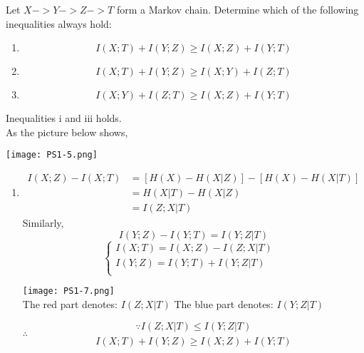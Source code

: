 \documentclass[12pt]{article}
\newenvironment{solution}[2][Solution]{\begin{trivlist}
\item[\hskip \labelsep {\bfseries #1}]}{\end{trivlist}}
\newenvironment{problem}[2][Problem]{\begin{trivlist}
\item[\hskip \labelsep {\bfseries #1}\hskip \labelsep {\bfseries #2.}]}{\end{trivlist}}
\begin{document}
\begin{problem}{8 Markov chain with 4 random variables}
    \item
    Let $X->Y->Z->T$ form a Markov chain. Determine which of the following inequalities always hold:
    \begin{enumerate}[label=\roman*]
        \item $$I(X;T)+I(Y;Z)\geq I(X;Z)+I(Y;T)$$
        \item $$I(X;T)+I(Y;Z)\geq I(X;Y)+I(Z;T)$$
        \item $$I(X;Y)+I(Z;T)\geq I(X;Z)+I(Y;T)$$
    \end{enumerate}
\end{problem}

\begin{solution}{}
    \item
    Inequalities i and iii holds.\\
    As the picture below shows,
    \begin{center}
        \texttt{[image: PS1-5.png]}
    \end{center}
    \begin{enumerate}[label=\roman*]
        \item
        \begin{align*}
            I(X;Z)-I(X;T)&=[H(X)-H(X|Z)]-[H(X)-H(X|T)]\\
                        &= H(X|T)-H(X|Z)\\
                        &= I(Z;X|T)
        \end{align*}
        Similarly, $$I(Y;Z)-I(Y;T)=I(Y;Z|T)$$
        \begin{equation}  
        \left\{  
             \begin{array}{lr}  
             I(X;T)=I(X;Z)-I(Z;X|T) &  \\  
             I(Y;Z)=I(Y;T)+I(Y;Z|T) &  \\  
             \end{array}  
        \right.  
        \end{equation}  
        \begin{center}
            \texttt{[image: PS1-7.png]}\\
            The red part denotes: $I(Z;X|T)$
            The blue part denotes: $I(Y;Z|T)$
        \end{center}
        $$\because I(Z;X|T)\leq I(Y;Z|T)$$
        $\therefore$ 
        \begin{equation}
            I(X;T)+I(Y;Z)\geq I(X;Z)+I(Y;T)
        \end{equation}
        

\end{enumerate}
\end{solution}
\end{document}
